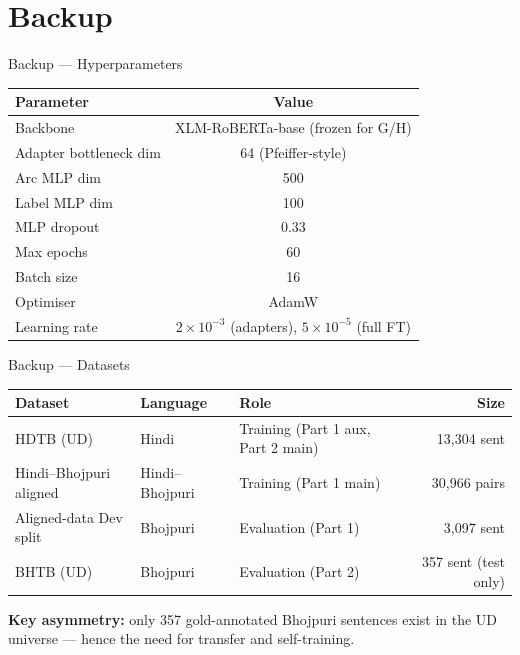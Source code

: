 \documentclass[aspectratio=169,10pt]{beamer}
\newcommand{\bho}{Bhojpuri}
\newcommand{\hi}{Hindi}
\newcommand{\xlmr}{XLM-RoBERTa}
\begin{document}

\appendix
\section*{Backup}

\begin{frame}{Backup --- Hyperparameters}
\centering
\begin{tabular}{@{}lc@{}}
\toprule
\textbf{Parameter} & \textbf{Value} \\
\midrule
Backbone                           & \xlmr{}-base (frozen for G/H) \\
Adapter bottleneck dim             & 64 (Pfeiffer-style) \\
Arc MLP dim                        & 500 \\
Label MLP dim                      & 100 \\
MLP dropout                        & 0.33 \\
Max epochs                         & 60 \\
Batch size                         & 16 \\
Optimiser                          & AdamW \\
Learning rate                      & $2\times10^{-3}$ (adapters), $5\times10^{-5}$ (full FT) \\
\bottomrule
\end{tabular}
\end{frame}

\begin{frame}{Backup --- Datasets}
\centering
\begin{tabular}{@{}lll r@{}}
\toprule
\textbf{Dataset} & \textbf{Language} & \textbf{Role} & \textbf{Size} \\
\midrule
HDTB (UD)               & \hi{}          & Training (Part 1 aux, Part 2 main) & 13{,}304 sent \\
\hi{}--\bho{} aligned    & \hi{}--\bho{}  & Training (Part 1 main)             & 30{,}966 pairs \\
Aligned-data Dev split   & \bho{}         & Evaluation (Part 1)                & 3{,}097 sent \\
BHTB (UD)               & \bho{}          & Evaluation (Part 2)                & 357 sent (test only) \\
\bottomrule
\end{tabular}

\vspace{0.7cm}
\textbf{Key asymmetry:} only 357 gold-annotated \bho{} sentences exist in the UD universe --- hence the need for transfer and self-training.
\end{frame}
\end{document}
